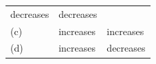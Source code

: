 \begin{enumerate}[noitemsep, label=\textbf{\arabic*}. ]
\begin{enumerate}[noitemsep, label=\textbf{\alph*}. ]
{\begin{tabular}[t]{|l|l|l|}
    
        decreases &
    
    
        decreases%
     \tabularnewline\cline{1-1}\cline{2-2}\cline{3-3}
    
    
        (c) &
    
    
        increases &
    
    
        increases%
     \tabularnewline\cline{1-1}\cline{2-2}\cline{3-3}
    
    
        (d) &
    
    
        increases &
    
    
        decreases%
     \tabularnewline\cline{1-1}\cline{2-2}\cline{3-3}
    \end{tabular}} %
\end{enumerate}
\end{enumerate}
